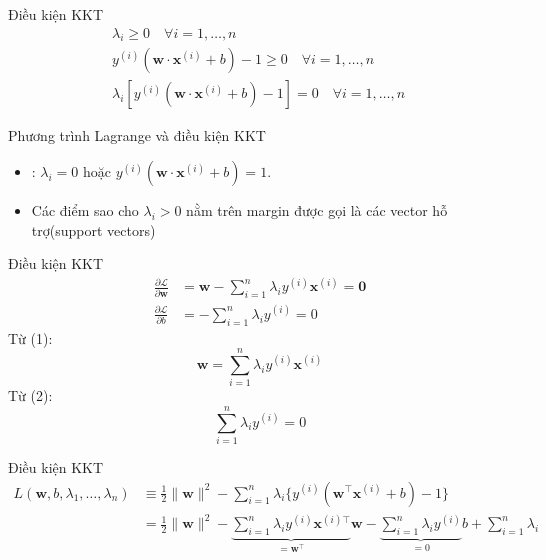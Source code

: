 \documentclass[serif, aspectratio=169]{beamer}
\begin{document}
	\begin{frame}{Điều kiện KKT}
		\begin{align*}
			& \lambda_i \geq 0 \quad \forall i=1,\ldots,n \quad\\
			& y^{(i)}(\mathbf{w} \cdot \mathbf{x}^{(i)} + b) - 1 \geq 0 \quad \forall i=1,\ldots,n \quad\\
			& \lambda_i [y^{(i)}(\mathbf{w} \cdot \mathbf{x}^{(i)} + b) - 1] = 0 \quad \forall i=1,\ldots,n \quad 
		\end{align*}
	\end{frame}
	
	\begin{frame}{Phương trình Lagrange và điều kiện KKT}
		\begin{itemize}
			\item {} : $\lambda_i = 0$ hoặc $y^{(i)}(\mathbf{w} \cdot \mathbf{x}^{(i)} + b) = 1$.
			\item Các điểm sao cho $\lambda_i > 0$ nằm trên margin được gọi là các vector hỗ trợ(support vectors)
			
		\end{itemize}
	\end{frame}
	\begin{frame}{Điều kiện KKT}
		\begin{align}
			\frac{\partial \mathcal{L}}{\partial \mathbf{w}} &= \mathbf{w} - \sum_{i=1}^{n} \lambda_i y^{(i)} \mathbf{x}^{(i)} = \mathbf{0} \\
			\frac{\partial \mathcal{L}}{\partial b} &= - \sum_{i=1}^{n} \lambda_i y^{(i)} = 0
		\end{align}
		Từ (1): \begin{equation}
			\mathbf{w} = \sum_{i=1}^{n} \lambda_i y^{(i)} \mathbf{x}^{(i)}
		\end{equation}
		Từ (2): \begin{equation}
			\sum_{i=1}^{n} \lambda_i y^{(i)} = 0
		\end{equation}
	\end{frame}
	
	\begin{frame}{Điều kiện KKT}
		\begin{align*} 
			L(\bm{w}, b, \lambda_1, \dots, \lambda_n) &\equiv \frac{1}{2}\|\bm{w}\|^2 - \sum_{i=1}^n \lambda_i \{ y^{(i)} (\bm{w}^{\top} \bm{x}^{(i)} + b) - 1 \} \\
			&= \frac{1}{2}\|\bm{w}\|^2 - \underbrace{\sum_{i=1}^n \lambda_i y^{(i)} \bm{x}^{(i)\top}}_{=\bm{w}^{\top}} \bm{w} - \underbrace{\sum_{i=1}^n\lambda_i y^{(i)}}_{=0} b + \sum_{i=1}^n \lambda_i 
		\end{align*}
	\end{frame}
	
\end{document}
